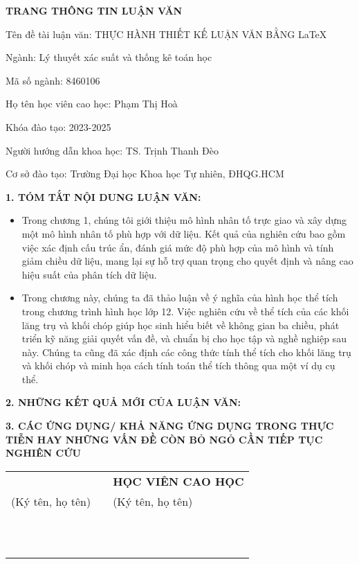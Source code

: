 {}
{\centering \bf TRANG THÔNG TIN LUẬN VĂN \par}
\vspace*{1cm}

Tên đề tài luận văn: THỰC HÀNH THIẾT KẾ LUẬN VĂN BẰNG \LaTeX

Ngành: Lý thuyết xác suất và thống kê toán học

Mã số ngành: 8460106

Họ tên học viên cao học: Phạm Thị Hoà

Khóa đào tạo: 2023-2025

Người hướng dẫn khoa học: TS. Trịnh Thanh Đèo

Cơ sở đào tạo: Trường Đại học Khoa học Tự nhiên, ĐHQG.HCM

{\bf 1. TÓM TẮT NỘI DUNG LUẬN VĂN:}
\begin{itemize}[label=-]
    \item Trong chương 1, chúng tôi giới thiệu mô hình nhân tố trực giao và xây dựng một mô hình nhân tố phù hợp với dữ liệu. Kết quả của nghiên cứu bao gồm việc xác định cấu trúc ẩn, đánh giá mức độ phù hợp của mô hình và tính giảm chiều dữ liệu, mang lại sự hỗ trợ quan trọng cho quyết định và nâng cao hiệu suất của phân tích dữ liệu.
    \item Trong chương này, chúng ta đã thảo luận về ý nghĩa của hình học thể tích trong chương trình hình học lớp 12. Việc nghiên cứu về thể tích của các khối lăng trụ và khối chóp giúp học sinh hiểu biết về không gian ba chiều, phát triển kỹ năng giải quyết vấn đề, và chuẩn bị cho học tập và nghề nghiệp sau này. Chúng ta cũng đã xác định các công thức tính thể tích cho khối lăng trụ và khối chóp và minh họa cách tính toán thể tích thông qua một ví dụ cụ thể.
\end{itemize}

{\bf 2. NHỮNG KẾT QUẢ MỚI CỦA LUẬN VĂN:}
\vspace*{1cm}

{\bf 3. CÁC ỨNG DỤNG/ KHẢ NĂNG ỨNG DỤNG TRONG THỰC TIỄN HAY NHỮNG VẤN ĐỀ CÒN BỎ NGỎ CẦN TIẾP TỤC NGHIÊN CỨU}
\vspace*{1cm}
\newpage
\begin{tabular}{>{\centering\arraybackslash}m{5cm} >{\centering\arraybackslash}m{5cm} >{\centering\arraybackslash}m{5cm}}
    {\bf TẬP THỂ CÁN BỘ HƯỚNG DẪN} & & {\bf HỌC VIÊN CAO HỌC} \\
    (Ký tên, họ tên) & & (Ký tên, họ tên) \\
    & & \\
    & & \\
    & & \\
    & & \\
    & & \\
    & & \\
    & & \\
    & & \\
    & & \\
    \multicolumn{3}{c}{\bf XÁC NHẬN CỦA CƠ SỞ ĐÀO TẠO} \\
    \multicolumn{3}{c}{\bf HIỆU TRƯỞNG} \\
\end{tabular}
